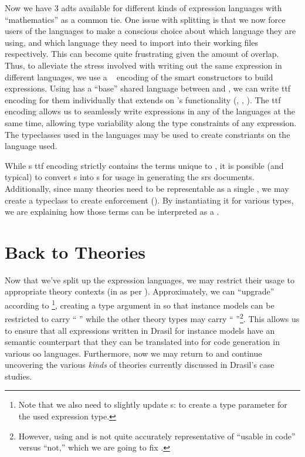 Now we have 3 \acsp{adt} available for different kinds of expression languages
with ``mathematics'' as a common tie. One issue with splitting is that we now
force users of the languages to make a conscious choice about which language
they are using, and which language they need to import into their working files
respectively. This can become quite frustrating given the amount of overlap.
Thus, to alleviate the stress involved with writing out the same expression in
different languages, we use a ~\cite{Carette2009} encoding of the smart
constructors to build expressions. Using \Expr{} has a ``base'' shared language
between \ModelExpr{} and \CodeExpr{}, we can write \acs{ttf} encoding for them
individually that extends on \Expr{}'s functionality
(, ,
). The \acs{ttf} encoding allows us to seamlessly
write expressions in any of the languages at the same time, allowing type
variability along the type constraints of any expression. The typeclasses used
in the languages may be used to create constriants on the language used.

While \ModelExpr{}s \acs{ttf} encoding strictly contains the terms unique to
\ModelExpr{}, it is possible (and typical) to convert \Expr{}s into
\ModelExpr{}s for usage in generating the \acs{srs} documents. Additionally,
since many theories need to be representable as a single \Relation{}, we may
create a typeclass to create enforcement (). By
instantiating it for various types, we are explaining how those terms can be
interpreted as a \ModelExpr{}.

\currentExpressHaskell{}
 
\section{Back to Theories}
\label{chap:lang-division:sec:back-to-theories}

Now that we've split up the expression languages, we may restrict their usage to
appropriate theory contexts (in \ModelKinds{} as per ).
Approximately, we can ``upgrade'' \ModelKinds{} according to
\footnote{Note that we also need to slightly
update \QDefinition{}s:  to create a type
parameter for the used expression type.}, creating a type argument in
\ModelKinds{} so that instance models can be restricted to carry ``\ModelKinds{}
\Expr{}'' while the other theory types may carry ``\ModelKinds{}
\ModelExpr{}''\footnote{However, using \Expr{} and \ModelExpr{} is not quite
accurately representative of ``usable in code'' versus ``not,'' which we are
going to fix \cite{DrasilIssue2853AlternativeModelKinds}.}. This allows us to
ensure that all expressions written in Drasil for instance models have an
semantic counterpart that they can be translated into for code generation in
various \acs{oo} languages. Furthermore, now we may return to \ModelKinds{} and
continue uncovering the various \textit{kinds} of theories currently discussed
in Drasil's case studies.

\pseudoPartialModelKindsUpgrade{}
